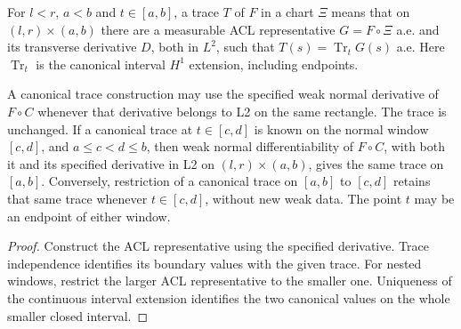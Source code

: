 \begin{definition}
\label{def:canonical-transverse-trace}
\leanok
For $l<r$, $a<b$ and $t\in[a,b]$, a trace $T$ of $F$ in a chart $\Xi$
means that on $(l,r)\times(a,b)$ there are a measurable ACL representative
$G=F\circ\Xi$ a.e. and its transverse derivative $D$, both in $L^2$, such that
$T(s)=\operatorname{Tr}_tG(s)$ a.e. Here $\operatorname{Tr}_t$ is the
canonical interval $H^1$ extension, including endpoints.
\end{definition}

\begin{lemma}
\label{lem:transverse-trace-window-consistency}
\leanok
A canonical trace construction may use the specified weak normal derivative
of $F\circ C$ whenever that derivative belongs to L2 on the same rectangle.
The trace is unchanged.
If a canonical trace at $t\in[c,d]$ is known on the normal window $[c,d]$,
and $a\le c<d\le b$, then weak normal differentiability of $F\circ C$,
with both it and its specified derivative in L2 on $(l,r)\times(a,b)$,
gives the same trace on $[a,b]$.
Conversely, restriction of a canonical trace on $[a,b]$ to $[c,d]$
retains that same trace whenever $t\in[c,d]$, without new weak data.
The point $t$ may be an endpoint of either window.
\end{lemma}

\begin{proof}
\leanok
Construct the ACL representative using the specified derivative.
Trace independence identifies its boundary values with the given trace.
For nested windows, restrict the larger ACL representative to the smaller
one. Uniqueness of the continuous interval extension identifies the two
canonical values on the whole smaller closed interval.
\end{proof}

